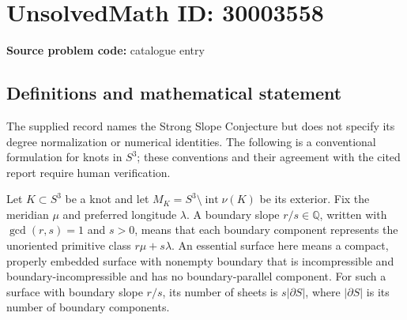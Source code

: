\documentclass[11pt]{article}
\newcommand{\Q}{\mathbb{Q}}
\begin{document}
\section*{UnsolvedMath ID: 30003558}
\textbf{Source problem code:} catalogue entry
\subsection{Definitions and mathematical statement}
The supplied record names the Strong Slope Conjecture but does not specify its degree normalization or numerical identities. The following is a conventional formulation for knots in \(S^3\); these conventions and their agreement with the cited report require human verification.

Let \(K\subset S^3\) be a knot and let \(M_K=S^3\setminus\operatorname{int}\nu(K)\) be its exterior. Fix the meridian \(\mu\) and preferred longitude \(\lambda\). A boundary slope \(r/s\in\Q\), written with \(\gcd(r,s)=1\) and \(s>0\), means that each boundary component represents the unoriented primitive class \(r\mu+s\lambda\). An essential surface here means a compact, properly embedded surface with nonempty boundary that is incompressible and boundary-incompressible and has no boundary-parallel component. For such a surface with boundary slope \(r/s\), its number of sheets is \(s|\partial S|\), where \(|\partial S|\) is its number of boundary components.
\end{document}
